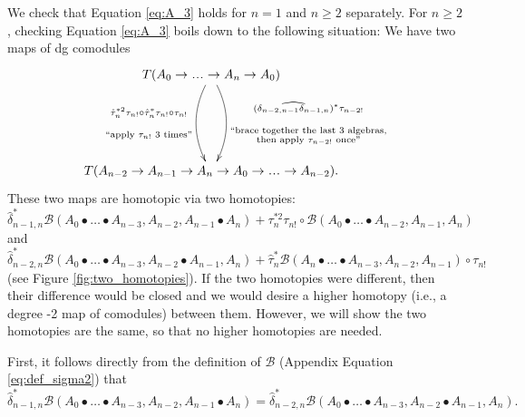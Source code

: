 We check that Equation \ref{eq:A_3} holds for 
$n=1$ and $n \geq 2$ separately. For $n\geq2$, 
checking Equation \ref{eq:A_3} boils down 
to the following situation:
We have two maps of dg comodules
\begin{equation}
\label{eq:two_maps}
\xymatrixrowsep{5pc}
\xymatrix{
T(A_0 \to \smdots \to A_n \to A_0) 
 \ar@/^1pc/[d]^{\substack{
   (\widehat{\delta_{n-2,n-1}\delta_{n-1,n}})^*
   \tau_{n-2!}\\\\\\
   \textrm{$``$brace together the last 3 algebras,}\\
   \textrm{then apply $\tau_{n-2!}$ once''}}}
 \ar@/_1pc/[d]_{\substack{
   \hat{\tau}_n^{*2} \tau_{n!}\circ
   \hat{\tau}_n^*\tau_{n!}\circ \tau_{n!}\\\\\\
   \textrm{$``$apply $\tau_{n!}$ 3 times''}}}\\
T(A_{n-2} \to A_{n-1} \to A_n \to 
A_0 \to \smdots \to A_{n-2}).
}
\end{equation}
These two maps are homotopic via 
two homotopies: 
$\hat{\delta}_{n-1,n}^*
  \mathcal{B}(A_0 \bullet \dots \bullet A_{n-3}, 
  A_{n-2}, A_{n-1}\bullet A_n)
+ \tau_n^{*2}\tau_{n!} \circ
  \mathcal{B}(A_0 \bullet \dots \bullet A_{n-2}, A_{n-1}, A_n)$ 
and 
$\hat{\delta}_{n-2,n}^*\mathcal{B}(A_0 \bullet \dots \bullet A_{n-3}, 
  A_{n-2} \bullet A_{n-1}, A_n)
+ \hat{\tau}_n^*\mathcal{B}(A_n \bullet \dots \bullet A_{n-3}, 
  A_{n-2}, A_{n-1}) \circ \tau_{n!}$ (see Figure 
\ref{fig:two_homotopies}). If the 
two homotopies were different, then 
their difference would be closed and
we would desire a higher homotopy (i.e., 
a degree -2 map of comodules) between 
them. However, we will show the 
two homotopies are the same, so that 
no higher homotopies are needed. 

First, it follows directly from the definition 
of $\mathcal{B}$ (Appendix Equation 
\ref{eq:def_sigma2}) that
$$\hat{\delta}_{n-1,n}^*
  \mathcal{B}(A_0 \bullet \dots \bullet A_{n-3}, 
  A_{n-2}, A_{n-1}\bullet A_n)
= \hat{\delta}_{n-2,n}^*\mathcal{B}(A_0 \bullet \dots \bullet A_{n-3}, 
  A_{n-2} \bullet A_{n-1}, A_n).$$


